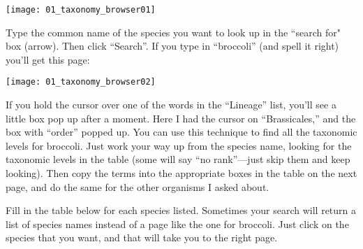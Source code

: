 \documentclass[11pt]{exam}
\begin{document}
\begin{center}
	\texttt{[image: 01\_taxonomy\_browser01]}
\end{center}

Type the common name of the species you want to look up in the “search
for" box (arrow). Then click “Search”. If you type in “broccoli” (and spell it right) you'll get
this page:



\begin{center}
	\texttt{[image: 01\_taxonomy\_browser02]}
\end{center}

If you hold the cursor over one of the words in the “Lineage” list,
you'll see a little box pop up after a moment. Here I had the cursor on
“Brassicales,” and the box with “order” popped up. You
can use this technique to find all the taxonomic levels for broccoli. 
Just work your way up from the species name, looking for the taxonomic
levels in the table (some will say “no rank”—just skip them and
keep looking). Then copy the terms into the appropriate boxes in the
table on the next page, and do the same for the other organisms I asked about.

Fill in the table below for each species listed. Sometimes your search
will return a list of species names instead of a page like the
one for broccoli. Just click on the species that you want, and that
will take you to the right page.

\end{document}
